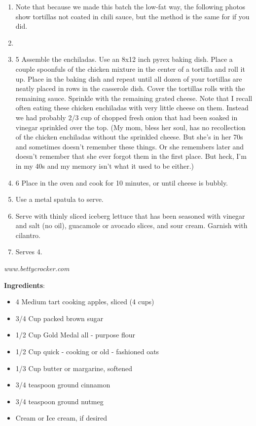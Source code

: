 \documentclass[11pt, twoside, openany]{book}
\begin{document}
\begin{enumerate}
\item Note that because we made this batch the low-fat way, the following photos show tortillas not coated in chili sauce, but the method is the same for if you did.
\item  
\item 5 Assemble the enchiladas. Use an 8x12 inch pyrex baking dish. Place a couple spoonfuls of the chicken mixture in the center of a tortilla and roll it up. Place in the baking dish and repeat until all dozen of your tortillas are neatly placed in rows in the casserole dish. Cover the tortillas rolls with the remaining sauce. Sprinkle with the remaining grated cheese. Note that I recall often eating these chicken enchiladas with very little cheese on them. Instead we had probably 2/3 cup of chopped fresh onion that had been soaked in vinegar sprinkled over the top. (My mom, bless her soul, has no recollection of the chicken enchiladas without the sprinkled cheese. But she's in her 70s and sometimes doesn't remember these things. Or she remembers later and doesn't remember that she ever forgot them in the first place. But heck, I'm in my 40s and my memory isn't what it used to be either.)
\item 6 Place in the oven and cook for 10 minutes, or until cheese is bubbly.
\item Use a metal spatula to serve.
\item Serve with thinly sliced iceberg lettuce that has been seasoned with vinegar and salt (no oil), guacamole or avocado slices, and sour cream. Garnish with cilantro.
\item Serves 4.
\end{enumerate}
 \label{apple-crisp}\hfill\textit{www.bettycrocker.com}\\
\begin{minipage}[t]{0.8\linewidth}
\textbf{Ingredients}:\vspace{-3mm}
\begin{multicols}{2}
\begin{itemize}\setlength\itemsep{-1mm}
\item 4 Medium tart cooking apples, sliced (4 cups)
\item 3/4 Cup packed brown sugar
\item 1/2 Cup Gold Medal all - purpose flour
\item 1/2 Cup quick - cooking or old - fashioned oats
\item 1/3 Cup butter or margarine, softened
\item 3/4 teaspoon ground cinnamon
\item 3/4 teaspoon ground nutmeg
\item Cream or Ice cream, if desired
\end{itemize}
\end{multicols}
\end{minipage}
\end{document}
